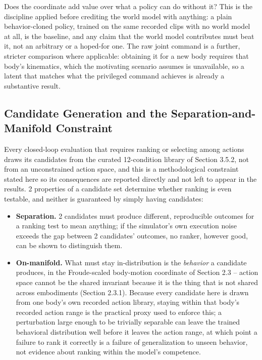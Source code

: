 \documentclass[12pt,a4paper,oneside]{report}
\begin{document}
\noindent Does the coordinate add value over what a policy can do without it? This is the discipline
applied before crediting the world model with anything: a plain behavior-cloned policy, trained on the
same recorded clips with no world model at all, is the baseline, and any claim that the world model contributes must
beat it, not an arbitrary or a hoped-for one. The raw joint command is a
further, stricter comparison where applicable: obtaining it for a new body requires that body's kinematics, which
the motivating scenario assumes is unavailable, so a latent that matches what the privileged command achieves is
already a substantive result.

\newpage
\subsection{Candidate Generation and the Separation-and-Manifold Constraint}
Every closed-loop evaluation that requires ranking or selecting among actions draws its candidates
from the curated 12-condition library of Section 3.5.2, not from an unconstrained action space, and this is a
methodological constraint stated here so its consequences are reported directly and not left to appear
in the results. 2 properties of a candidate set determine whether ranking is even testable, and
neither is guaranteed by simply having candidates:

\begin{itemize}[label=--]
\item \textbf{Separation.} 2 candidates must produce different, reproducible outcomes for a ranking
  test to mean anything; if the simulator's own execution noise exceeds the gap between 2 candidates' outcomes,
  no ranker, however good, can be shown to distinguish them.
\item \textbf{On-manifold.} What must stay in-distribution is the \emph{behavior} a candidate produces, in the
  Froude-scaled body-motion coordinate of Section 2.3 -- action space cannot be the shared invariant because it is the thing that is not shared
  across embodiments (Section 2.3.1). Because every candidate here is drawn from one body's own recorded action
  library, staying within that body's recorded action range is the practical proxy used to enforce this; a
  perturbation large enough to be trivially separable can leave the trained behavioral distribution well before it
  leaves the action range, at which point a failure to rank it correctly is a failure of generalization to
  unseen behavior, not evidence about ranking within the model's competence.
\end{itemize}
\end{document}
